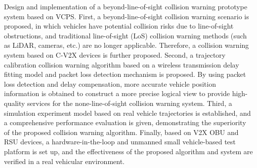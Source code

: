\begin{eabstract}
 Design and implementation of a beyond-line-of-sight collision warning prototype system based on VCPS.
First, a beyond-line-of-sight collision warning scenario is proposed, in which vehicles have potential collision risks due to line-of-sight obstructions, and traditional line-of-sight (LoS) collision warning methods (such as LiDAR, cameras, etc.) are no longer applicable. 
Therefore, a collision warning system based on C-V2X devices is further proposed.
Second, a trajectory calibration collision warning algorithm based on a wireless transmission delay fitting model and packet loss detection mechanism is proposed. 
By using packet loss detection and delay compensation, more accurate vehicle position information is obtained to construct a more precise logical view to provide high-quality services for the none-line-of-sight collision warning system.
Third, a simulation experiment model based on real vehicle trajectories is established, and a comprehensive performance evaluation is given, demonstrating the superiority of the proposed collision warning algorithm.
Finally, based on V2X OBU and RSU devices, a hardware-in-the-loop and unmanned small vehicle-based test platform is set up, and the effectiveness of the proposed algorithm and system are verified in a real vehicular environment.
 
\end{eabstract}


